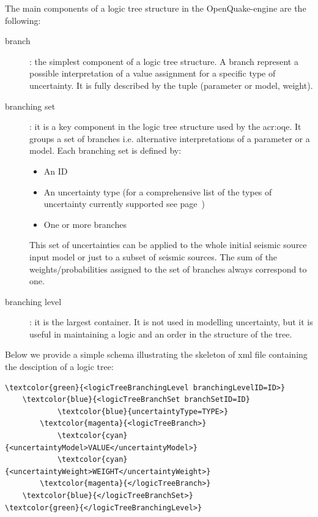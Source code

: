 The main components of a logic tree structure in the OpenQuake-engine are the
following:

\begin{description}

    \item[branch]: the simplest component of a logic tree structure. A branch
	represent a possible interpretation of a value assignment for a specific type
	of uncertainty. It is fully described by the tuple (parameter or model,
	weight).

    \item[branching set]: it is a key component in the logic tree structure
	used by the \gls{acr:oqe}. It groups a set of branches i.e. alternative
	interpretations of a parameter or a model. Each branching set is defined by:

    \begin{itemize}

        \item An ID

        \item An uncertainty type (for a comprehensive list of the types of
		uncertainty currently supported see page~\pageref{list_epistemic_unc})

        \item One or more branches

    \end{itemize}

    This set of uncertainties can be applied to the whole initial  seismic
    source input model or just to a subset of seismic sources. The sum of the
    weights/probabilities assigned to the set  of branches always correspond
    to one.

    \item[branching level]: it is the largest container. It is not used in
	modelling uncertainty, but it is useful in maintaining a logic and an
	order in the structure of the tree.

\end{description}

Below we provide a simple schema illustrating the skeleton of xml file
containing the desciption of a logic tree:

\begin{Verbatim}[frame=single, commandchars=\\\{\}, fontsize=\small]
\textcolor{green}{<logicTreeBranchingLevel branchingLevelID=ID>}
    \textcolor{blue}{<logicTreeBranchSet branchSetID=ID}
            \textcolor{blue}{uncertaintyType=TYPE>}
        \textcolor{magenta}{<logicTreeBranch>}
            \textcolor{cyan}{<uncertaintyModel>VALUE</uncertaintyModel>}
            \textcolor{cyan}{<uncertaintyWeight>WEIGHT</uncertaintyWeight>}
        \textcolor{magenta}{</logicTreeBranch>}
    \textcolor{blue}{</logicTreeBranchSet>}
\textcolor{green}{</logicTreeBranchingLevel>}
\end{Verbatim}

